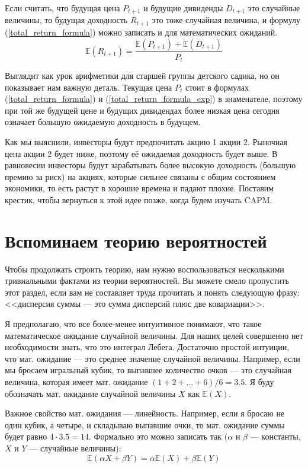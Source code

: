 Если считать, что будущая цена $P_{t+1}$ и будущие дивиденды $D_{t+1}$ это случайные величины, то будущая доходность $R_{t+1}$ это тоже случайная величина, и формулу (\ref{total_return_formula}) можно записать и для математических ожиданий.
\begin{equation}
\mathbb{E}(R_{t+1}) = \dfrac{\mathbb{E}(P_{t+1}) + \mathbb{E}(D_{t+1})}{P_t}
\label{total_return_formula_exp}
\end{equation}

Выглядит как урок арифметики для старшей группы детского садика, но он показывает нам важную деталь. Текущая цена $P_t$ стоит в формулах (\ref{total_return_formula}) и (\ref{total_return_formula_exp}) в знаменателе, поэтому при той же будущей цене и будущих дивидендах более низкая цена сегодня означает большую ожидаемую доходность в будущем.

Как мы выяснили, инвесторы будут предпочитать акцию 1 акции 2. Рыночная цена акции 2 будет ниже, поэтому её ожидаемая доходность будет выше. В равновесии инвесторы будут зарабатывать более высокую доходность (большую премию за риск) на акциях, которые сильнее связаны с общим состоянием экономики, то есть растут в хорошие времена и падают плохие. Поставим крестик, чтобы вернуться к этой идее позже, когда будем изучать CAPM.

\section*{Вспоминаем теорию вероятностей}

Чтобы продолжать строить теорию, нам нужно воспользоваться несколькими тривиальными фактами из теории вероятностей. Вы можете смело пропустить этот раздел, если вам не составляет труда прочитать и понять следующую фразу: <<дисперсия суммы --- это сумма дисперсий плюс две ковариации>>.

Я предполагаю, что все более-менее интуитивное понимают, что такое математическое ожидание случайной величины. Для наших целей совершенно нет необходимости знать, что это интеграл Лебега. Достаточно простой интуиции, что мат. ожидание --- это среднее значение случайной величины. Например, если мы бросаем игральный кубик, то выпавшее количество очков --- это случайная величина, которая имеет мат. ожидание $(1+2+...+6)/6=3.5$. Я буду обозначать мат. ожидание случайной величины $X$ как $\mathbb{E}(X)$.

Важное свойство мат. ожидания --- линейность. Например, если я бросаю не один кубик, а четыре, и складываю выпавшие очки, то мат. ожидание суммы будет равно $4 \cdot 3.5 =  14$. Формально это можно записать так ($\alpha$ и $\beta$ --- константы, $X$ и $Y$ --- случайные величины):
\begin{equation*}
\mathbb{E}(\alpha X + \beta Y) = \alpha\mathbb{E}(X) + \beta\mathbb{E}(Y)
\end{equation*}

